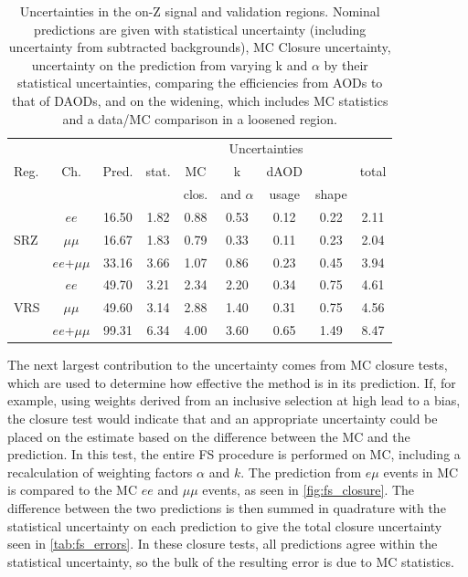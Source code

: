 \begin{table}[!ht]
\begin{center}
 \begin{tabular}{lcc|cccccc}
 \hline 
 \multirow{3}{*}{Reg.}	& \multirow{3}{*}{Ch.} 	& \multirow{3}{*}{Pred.} & \multicolumn{6}{c}{Uncertainties} \\
   \cline{4-9} 
   		 	& 		 	& 	  		& stat.  		& MC 		& k  			& dAOD 		& \mll  	& total \\
   			& 			& 		 	& 			 	& clos. 	& and $\alpha$	& usage	 	& shape  	& \\
   \hline
   \hline
\multirow{3}{*}{SRZ}
& $ee$ & 16.50 & 1.82 & 0.88 & 0.53 & 0.12 & 0.22 & 2.11 \\ 
& $\mu\mu$ & 16.67 & 1.83 & 0.79 & 0.33 & 0.11 & 0.23 & 2.04 \\ 
& $ee$+$\mu\mu$ & 33.16 & 3.66 & 1.07 & 0.86 & 0.23 & 0.45 & 3.94 \\ 
\hline
\multirow{3}{*}{VRS}
& $ee$ & 49.70 & 3.21 & 2.34 & 2.20 & 0.34 & 0.75 & 4.61 \\ 
& $\mu\mu$ & 49.60 & 3.14 & 2.88 & 1.40 & 0.31 & 0.75 & 4.56 \\ 
& $ee$+$\mu\mu$ & 99.31 & 6.34 & 4.00 & 3.60 & 0.65 & 1.49 & 8.47 \\ 
\hline
 
\hline
\hline
 \end{tabular}
\end{center}
 \caption{
   Uncertainties in the on-Z signal and validation regions. Nominal predictions are given with statistical uncertainty (including uncertainty from subtracted backgrounds), MC Closure uncertainty, uncertainty on the prediction from varying k and $\alpha$ by their statistical uncertainties, comparing the efficiencies from AODs to that of DAODs, and on the \mll widening, which includes MC statistics and a data/MC comparison in a loosened region.
 }
 \label{tab:fs_errors}
\end{table}

The next largest contribution to the uncertainty comes from \ac{MC} closure tests, which are used to determine how effective the method is in its prediction. If, for example, using weights derived from an inclusive selection at high \met lead to a bias, the closure test would indicate that and an appropriate uncertainty could be placed on the estimate based on the difference between the \ac{MC} and the prediction. In this test, the entire \ac{FS} procedure is performed on \ttbar \ac{MC}, including a recalculation of weighting factors $\alpha$ and $k$. The prediction from $e\mu$ events in \ac{MC} is compared to the \ac{MC} $ee$ and $\mu\mu$ events, as seen in \autoref{fig:fs_closure}. The difference between the two predictions is then summed in quadrature with the statistical uncertainty on each prediction to give the total closure uncertainty seen in \autoref{tab:fs_errors}. In these closure tests, all predictions agree within the statistical uncertainty, so the bulk of the resulting error is due to \ac{MC} statistics. 

